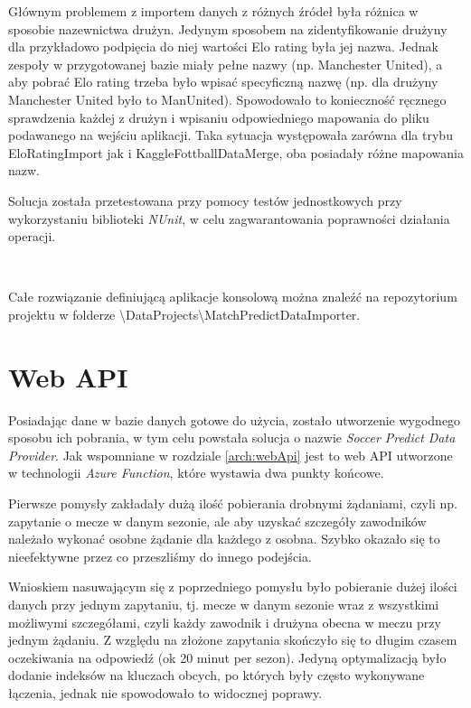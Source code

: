         Głównym problemem z importem danych z różnych źródeł była różnica w sposobie nazewnictwa drużyn. Jedynym sposobem na zidentyfikowanie drużyny dla przykładowo podpięcia do niej wartości Elo rating była jej nazwa. Jednak zespoły w przygotowanej bazie miały pełne nazwy (np. Manchester United), a aby pobrać Elo rating trzeba było wpisać specyficzną nazwę (np. dla drużyny Manchester United było to ManUnited). Spowodowało to konieczność ręcznego sprawdzenia każdej z drużyn i wpisaniu odpowiedniego mapowania do pliku podawanego na wejściu aplikacji. Taka sytuacja występowała zarówna dla trybu EloRatingImport jak i KaggleFottballDataMerge, oba posiadały różne mapowania nazw.
        
        Solucja została przetestowana przy pomocy testów jednostkowych przy wykorzystaniu biblioteki \textit{NUnit}, w celu zagwarantowania poprawności działania operacji.
        
        ~
        
        Całe rozwiązanie definiującą aplikacje konsolową można znaleźć na repozytorium projektu \cite{repo} w folderze \textbackslash DataProjects\textbackslash MatchPredictDataImporter.
        
        
    \section{Web API}
    \noindent
    Posiadając dane w bazie danych gotowe do użycia, zostało utworzenie wygodnego sposobu ich pobrania, w tym celu powstała solucja o nazwie \textit{Soccer Predict Data Provider}. Jak wspomniane w rozdziale \ref{arch:webApi} jest to web API utworzone w technologii \textit{Azure Function}, które wystawia dwa punkty końcowe. 
    
    Pierwsze pomysły zakładały dużą ilość pobierania drobnymi żądaniami, czyli np. zapytanie o mecze w danym sezonie, ale aby uzyskać szczegóły zawodników należało wykonać osobne żądanie dla każdego z osobna. Szybko okazało się to nieefektywne przez co przeszliśmy do innego podejścia.
    
    Wnioskiem nasuwającym się z poprzedniego pomysłu było pobieranie dużej ilości danych przy jednym zapytaniu, tj. mecze w danym sezonie wraz z wszystkimi możliwymi szczegółami, czyli każdy zawodnik i drużyna obecna w meczu przy jednym żądaniu. Z względu na złożone zapytania skończyło się to długim czasem oczekiwania na odpowiedź (ok 20 minut per sezon). Jedyną optymalizacją było dodanie indeksów na kluczach obcych, po których były często wykonywane łączenia, jednak nie spowodowało to widocznej poprawy. 
    
